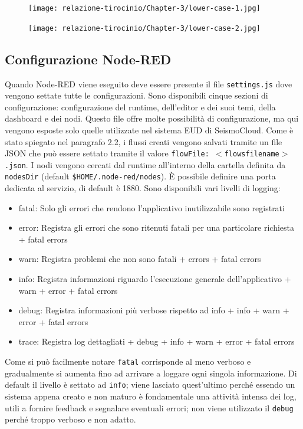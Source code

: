 \documentclass[a4paper,10pt]{memoir}
\begin{document}
\begin{figure}[ht]
    \texttt{[image: relazione-tirocinio/Chapter-3/lower-case-1.jpg]}
    \label{fig:lower-case-1}
\end{figure}

\begin{figure}[ht]
    \texttt{[image: relazione-tirocinio/Chapter-3/lower-case-2.jpg]}
    \label{fig:lower-case-2}
\end{figure}

\subsection{Configurazione Node-RED}

Quando Node-RED viene eseguito deve essere presente il file \texttt{settings.js} dove vengono settate tutte le configurazioni\cite{noderedconfig}.
Sono disponibili cinque sezioni di configurazione: configurazione del runtime, dell'editor e dei suoi temi, della dashboard e dei nodi.
Questo file offre molte possibilità di configurazione, ma qui vengono esposte solo quelle utilizzate nel sistema EUD di SeismoCloud.
Come è stato spiegato nel paragrafo 2.2, i flussi creati vengono salvati tramite un file JSON che può essere settato tramite il valore \texttt{flowFile: $<$flowsfilename$>$.json}.
I nodi vengono cercati dal runtime all'interno della cartella definita da \texttt{nodesDir} (default \texttt{\$HOME/.node-red/nodes}).
È possibile definire una porta dedicata al servizio, di default è 1880.
Sono disponibili vari livelli di logging:
\begin{itemize}
    \item fatal: Solo gli errori che rendono l'applicativo inutilizzabile sono registrati
    \item error: Registra gli errori che sono ritenuti fatali per una particolare richiesta + fatal errors
    \item warn: Registra problemi che non sono fatali + errors + fatal errors
    \item info: Registra informazioni riguardo l'esecuzione generale dell'applicativo + warn + error + fatal errors
    \item debug: Registra informazioni più verbose rispetto ad info + info + warn + error + fatal errors
    \item trace: Registra log dettagliati + debug + info + warn + error + fatal errors
\end{itemize}

Come si può facilmente notare \texttt{fatal} corrisponde al meno verboso e gradualmente si aumenta fino ad arrivare a loggare ogni singola informazione. Di default il livello è settato ad \texttt{info}; viene lasciato quest'ultimo perché essendo un sistema appena creato e non maturo è fondamentale una attività intensa dei log, utili a fornire feedback e segnalare eventuali errori; non viene utilizzato il \texttt{debug} perché troppo verboso e non adatto.
\end{document}
